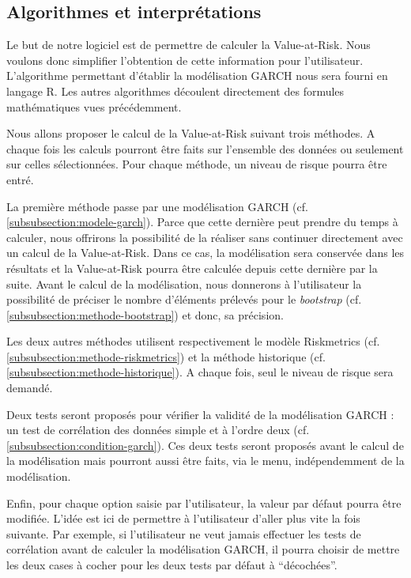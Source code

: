 	\subsection{Algorithmes et interprétations}
		Le but de notre logiciel est de permettre de calculer la Value-at-Risk. Nous voulons donc simplifier l’obtention de cette information pour l’utilisateur. L’algorithme permettant d'établir la modélisation GARCH nous sera fourni en langage R. Les autres algorithmes découlent directement des formules mathématiques vues précédemment.

		Nous allons proposer le calcul de la Value-at-Risk suivant trois méthodes. A chaque fois les calculs pourront être faits sur l’ensemble des données ou seulement sur celles sélectionnées. Pour chaque méthode, un niveau de risque pourra être entré.

		La première méthode passe par une modélisation GARCH (cf. \ref{subsubsection:modele-garch}). Parce que cette dernière peut prendre du temps à calculer, nous offrirons la possibilité de la réaliser sans continuer directement avec un calcul de la Value-at-Risk. Dans ce cas, la modélisation sera conservée dans les résultats et la Value-at-Risk pourra être calculée depuis cette dernière par la suite. Avant le calcul de la modélisation, nous donnerons à l’utilisateur la possibilité de préciser le nombre d’éléments prélevés pour le \textit{bootstrap} (cf. \ref{subsubsection:methode-bootstrap}) et donc, sa précision.

		Les deux autres méthodes utilisent respectivement le modèle Riskmetrics (cf. \ref{subsubsection:methode-riskmetrics}) et la méthode historique (cf. \ref{subsubsection:methode-historique}). A chaque fois, seul le niveau de risque sera demandé.

		Deux tests seront proposés pour vérifier la validité de la modélisation GARCH : un test de corrélation des données simple et à l’ordre deux (cf. \ref{subsubsection:condition-garch}). Ces deux tests seront proposés avant le calcul de la modélisation mais pourront aussi être faits, via le menu, indépendemment de la modélisation.

		Enfin, pour chaque option saisie par l’utilisateur, la valeur par défaut pourra être modifiée. L’idée est ici de permettre à l’utilisateur d’aller plus vite la fois suivante. Par exemple, si l’utilisateur ne veut jamais effectuer les tests de corrélation avant de calculer la modélisation GARCH, il pourra choisir de mettre les deux cases à cocher pour les deux tests par défaut à “décochées”.


